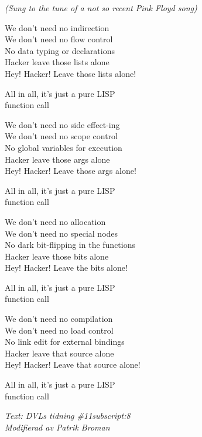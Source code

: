 {\footnotesize\textit{(Sung to the tune of a not so recent Pink Floyd song)}}\par
\vspace{10pt}
We don't need no indirection\\
We don't need no flow control\\
No data typing or declarations\\
Hacker leave those lists alone\\
Hey! Hacker! Leave those lists alone!\par
\vspace{10pt}
All in all, it's just a pure LISP\\
function call\par
\vspace{10pt}
We don't need no side effect-ing\\
We don't need no scope control\\
No global variables for execution\\
Hacker leave those args alone\\
Hey! Hacker! Leave those args alone!\par
\vspace{10pt}
All in all, it's just a pure LISP\\
function call\par
\vspace{10pt}
We don't need no allocation\\
We don't need no special nodes\\
No dark bit-flipping in the functions\\
Hacker leave those bits alone\\
Hey! Hacker! Leave the bits alone!\par
\vspace{10pt}
All in all, it's just a pure LISP\\
function call\par
\newpage
We don't need no compilation\\
We don't need no load control\\
No link edit for external bindings\\
Hacker leave that source alone\\
Hey! Hacker! Leave that source alone!\par
\vspace{10pt}
All in all, it's just a pure LISP\\
function call\par
\vspace{10pt}
{\footnotesize\textit{Text: DVLs tidning \#11subscript:8\\
Modifierad av Patrik Broman}}
